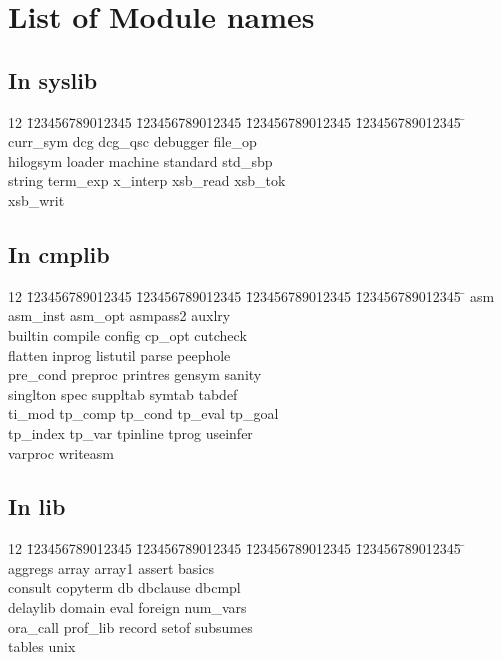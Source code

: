 \chapter{List of Module names} \label{module_names}

\section{In syslib}

\begin{tabbing}
12 \= 123456789012345 \= 123456789012345 \= 123456789012345 \= 123456789012345 \= \kill
 \> curr\_sym	\> dcg		\> dcg\_qsc	\> debugger	\> file\_op	\\
 \> hilogsym	\> loader	\> machine	\> standard	\> std\_sbp	\\
 \> string	\> term\_exp	\> x\_interp	\> xsb\_read	\> xsb\_tok	\\
 \> xsb\_writ
\end{tabbing}


\section{In cmplib}

\begin{tabbing}
12 \= 123456789012345 \= 123456789012345 \= 123456789012345 \= 123456789012345 \= \kill
 \> asm		\> asm\_inst	\> asm\_opt	\> asmpass2	\> auxlry	\\
 \> builtin	\> compile	\> config	\> cp\_opt	\> cutcheck	\\
 \> flatten	\> inprog	\> listutil	\> parse	\> peephole	\\
 \> pre\_cond	\> preproc	\> printres	\> gensym	\> sanity	\\
 \> singlton	\> spec		\> suppltab	\> symtab	\> tabdef	\\
 \> ti\_mod	\> tp\_comp	\> tp\_cond	\> tp\_eval	\> tp\_goal	\\
 \> tp\_index	\> tp\_var	\> tpinline	\> tprog	\> useinfer	\\
 \> varproc	\> writeasm
\end{tabbing}


\section{In lib}

\begin{tabbing}
12 \= 123456789012345 \= 123456789012345 \= 123456789012345 \= 123456789012345 \= \kill
 \> aggregs	\> array	\> array1	\> assert	\> basics	\\
 \> consult	\> copyterm	\> db		\> dbclause	\> dbcmpl	\\
 \> delaylib	\> domain	\> eval		\> foreign	\> num\_vars	\\
 \> ora\_call	\> prof\_lib	\> record	\> setof	\> subsumes	\\
 \> tables	\> unix
\end{tabbing}

